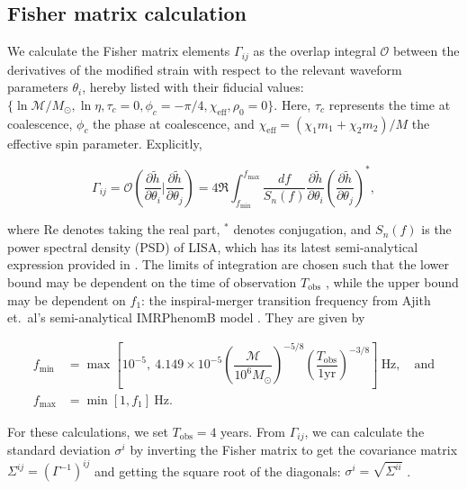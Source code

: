 \documentclass[10pt,a4paper,twoside]{article}
\begin{document}
\subsection{Fisher matrix calculation}\label{methoFisher} 
We calculate the Fisher matrix elements $\Gamma_{ij}$ as the overlap integral $\mathcal{O}$ \cite{maggiore2008gravitational} between the derivatives of the modified strain with respect to the relevant waveform parameters $\theta_i$, hereby listed with their fiducial values: $\{\ln \mathcal{M}/M_{\odot}, \ln \eta, \tau_c = 0, \phi_c = -\pi/4, \chi_{\text{eff}}, \rho_0 = 0 \}$. Here, $\tau_c$ represents the time at coalescence, $\phi_c$ the phase at coalescence, and $\chi_{\text{eff}} = (\chi_1 m_1 + \chi_2 m_2)/M$ the effective spin parameter. Explicitly,

\begin{equation}
    \Gamma_{ij} = \mathcal{O}\left(\dfrac{\partial \tilde{h}}{\partial \theta_i} \Bigg\rvert \dfrac{\partial \tilde{h}}{\partial \theta_j} \right) = 4 \Re \int_{f_{\text{min}}}^{f_{\text{max}}} \dfrac{df}{S_n(f)} \dfrac{\partial \tilde{h}}{\partial \theta_i} \left(\dfrac{\partial \tilde{h}}{\partial \theta_j}\right)^*,
\end{equation}

\noindent where Re denotes taking the real part, $^*$ denotes conjugation, and $S_n(f)$ is the power spectral density (PSD) of LISA, which has its latest semi-analytical expression provided in \cite{Robson2019}. The limits of integration are chosen such that the lower bound may be dependent on the time of observation $T_{\text{obs}}$ \cite{Berti2005}, while the upper bound may be dependent on $f_1$: the inspiral-merger transition frequency from Ajith et.~al's semi-analytical IMRPhenomB model \cite{Ajith2011}. They are given by

\begin{align}
f_{\text{min}} &= \max \left[10^{-5}, ~4.149 \times 10^{-5} \left(\dfrac{\mathcal{M}}{10^6 M_{\odot}}\right)^{-5/8} \left(\dfrac{T_{\text{obs}}}{1 \text{yr}}\right)^{-3/8} \right] ~\text{Hz}, \quad \text{and} \\
f_{\text{max}} &= \min \left[1, f_1\right] ~\text{Hz}. 
\end{align}

For these calculations, we set $T_{\text{obs}} = 4$ years. From $\Gamma_{ij}$, we can calculate the standard deviation $\sigma^{i}$ by inverting the Fisher matrix to get the covariance matrix $\Sigma^{ij} = (\Gamma^{-1})^{ij}$ and getting the square root of the diagonals: $\sigma^{i} = \sqrt{\Sigma^{ii}}$ \cite{maggiore2008gravitational, Vallisneri2008}.
\end{document}
